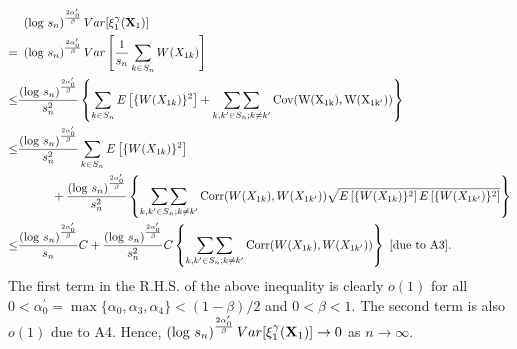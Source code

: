 \documentclass[twoside]{article}
\def\log{\hbox{log}}
\def\Corr{\hbox{Corr}}
\def\Corr{\hbox{Corr}}
\newcommand{\bX}{\mathbf{X}}
\newcommand{\0}{\mathbf{0}}
\newcommand{\1}{\mathbf{1}}
\numberwithin{equation}{section}
\begin{document}
\begin{align}%
    &\ \left (\log\ s_n\right )^\frac{2\alpha^\prime_0}{\beta}Var[\xi_1^\gamma(\bX_1)]\nonumber \\
    =&\ \left (\log\ s_n\right )^\frac{2\alpha^\prime_0}{\beta}Var\left [\frac{1}{s_n}\sum\limits_{k\in S_n} W(X_{1k})\right ]\nonumber \\
    \leq & \frac{\left (\log\ s_n\right )^\frac{2\alpha^\prime_0}{\beta}}{s^2_n}\left \{\sum\limits_{k\in S_n}E\left [\{W(X_{1k})\}^2\right ] +\mathop{\sum\sum}\limits_{k,k^\prime\in S_n; k\neq k^\prime}\rm{Cov}(W(X_{1k}),W(X_{1k^\prime}))\right\}\nonumber \\
    \leq & \frac{\left (\log\ s_n\right )^\frac{2\alpha^\prime_0}{\beta}}{s^2_n}\sum\limits_{k\in S_n}E\left [\{W(X_{1k})\}^2\right ]\nonumber \\ &\hspace{1cm}+\frac{\left (\log\ s_n\right )^\frac{2\alpha^\prime_0}{\beta}}{s^2_n}\left\{\mathop{\sum\sum}\limits_{k,k^\prime\in S_n; k\neq k^\prime}\Corr(W(X_{1k}),W(X_{1k^\prime}))\sqrt{E\left [\{W(X_{1k})\}^2\right ]E\left [\{W(X_{1k^\prime})\}^2\right ]}\right \}\nonumber \\
    \leq & \frac{\left (\log\ s_n\right )^\frac{2\alpha^\prime_0}{\beta}}{s_n}C+\frac{\left (\log\ s_n\right )^\frac{2\alpha^\prime_0}{\beta}}{s^2_n}C\left\{\mathop{\sum\sum}\limits_{k,k^\prime\in S_n; k\neq k^\prime}\Corr{(W(X_{1k}),W(X_{1k^\prime}))}\right \}\ [\text{due to A3}].
\end{align}
The first term in the R.H.S. of the above inequality is clearly $o(1)$ for all $0<\alpha^\prime_0=\max\{\alpha_0,\alpha_3,\alpha_4\}<(1-\beta)/2$ and $0<\beta <1.$ The second term is also $o(1)$ due to A4. Hence, $\left (\log\ s_n\right )^\frac{2\alpha^\prime_0}{\beta}Var[\xi_1^\gamma(\bX_1)]\to 0$ as $n\to\infty.$\newline
\end{document}
